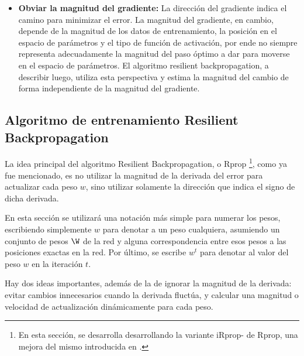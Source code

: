 \begin{itemize}
\item \textbf{Obviar la magnitud del gradiente:} La dirección del gradiente indica el camino para minimizar el error. La magnitud del gradiente, en cambio, depende de la magnitud de los datos de entrenamiento, la posición en el espacio de parámetros y el tipo de función de activación, por ende no siempre representa adecuadamente la magnitud del paso óptimo a dar para moverse en el espacio de parámetros. El algoritmo resilient backpropagation, a describir luego, utiliza esta perspectiva y estima la magnitud del cambio de forma independiente de la magnitud del gradiente.
\end{itemize}


\subsection{Algoritmo de entrenamiento Resilient Backpropagation}

\newcommand{\wi}{w_i}
\newcommand{\wt}{w^t}
\newcommand{\wtp}{w^{t+1}}
\newcommand{\wtm}{w^{t-1}}

\newcommand{\vmax}{\Delta_{max}}
\newcommand{\vmin}{\Delta_{min}}
\newcommand{\accinc}{\eta^+}
\newcommand{\accdec}{\eta^-}
\newcommand{\vt}{\Delta^{t}_w}
\newcommand{\vtp}{\Delta^{t+1}_w}
\newcommand{\vtm}{\Delta^{t-1}_w}
\newcommand{\dvt}{\dv{E(t)}{\wt}}
\newcommand{\dvtm}{\dv{E(t-1)}{\wtm}}
\newcommand{\dwtm}{\Delta\wtm}
\newcommand{\dwt}{\Delta\wt}
\newcommand{\multidv}{ \dvt \cdot \dvtm}


La idea principal del algoritmo Resilient Backpropagation, o Rprop \cite{Riedmiller93} \footnote{En esta sección, se desarrolla desarrollando la variante iRprop- de Rprop, una mejora del mismo introducida en \cite{Igel00,Igel03}.}, como ya fue mencionado, es no utilizar la magnitud de la derivada del error para actualizar cada peso $w$, sino utilizar solamente la dirección que indica el signo de dicha derivada. 

En esta sección se utilizará una notación más simple para numerar los pesos, escribiendo simplemente $w$ para denotar a un peso cualquiera, asumiendo un conjunto de pesos $\W$ de la red y alguna correspondencia entre esos pesos a las posiciones exactas en la red. Por último, se escribe $\wt$ para denotar al valor del peso $w$ en la iteración $t$.  

Hay dos ideas importantes, además de la de ignorar la magnitud de la derivada: evitar cambios innecesarios cuando la derivada fluctúa, y calcular una magnitud o velocidad de actualización dinámicamente para cada peso.

